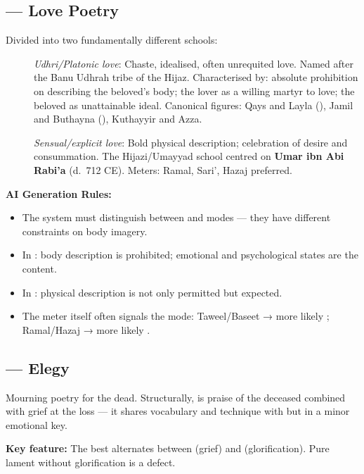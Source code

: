 \subsection{ — Love Poetry}
\label{subsec:ghazal}

Divided into two fundamentally different schools:

\begin{description}
  \item[] \textit{Udhri/Platonic love}: Chaste, idealised, often unrequited love. Named after the Banu Udhrah tribe of the Hijaz. Characterised by: absolute prohibition on describing the beloved's body; the lover as a willing martyr to love; the beloved as unattainable ideal. Canonical figures: Qays and Layla (), Jamil and Buthayna (), Kuthayyir and Azza.
  \item[] \textit{Sensual/explicit love}: Bold physical description; celebration of desire and consummation. The Hijazi/Umayyad school centred on \textbf{Umar ibn Abi Rabi'a} (d.~712 CE). Meters: Ramal, Sari', Hazaj preferred.
\end{description}

\textbf{AI Generation Rules:}
\begin{itemize}
  \item The system must distinguish between  and  modes — they have different constraints on body imagery.
  \item In : body description is prohibited; emotional and psychological states are the content.
  \item In : physical description is not only permitted but expected.
  \item The meter itself often signals the mode: Taweel/Baseet → more likely ; Ramal/Hazaj → more likely .
\end{itemize}

\subsection{ — Elegy}
\label{subsec:ritha}

Mourning poetry for the dead. Structurally,  is praise of the deceased combined with grief at the loss — it shares vocabulary and technique with  but in a minor emotional key.

\textbf{Key feature:} The best  alternates between  (grief) and  (glorification). Pure lament without glorification is a defect.

